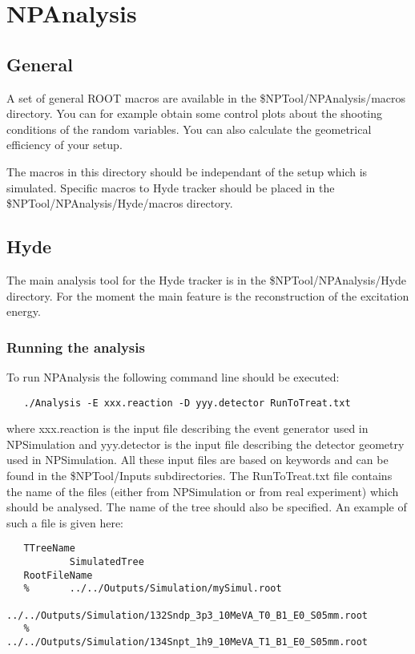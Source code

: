 \documentclass[a4paper,12pt]{article}
\begin{document}
\section{NPAnalysis}
\subsection{General}
A set of general ROOT macros are available in the \$NPTool/NPAnalysis/macros 
directory. You can for example obtain some control plots about the shooting
conditions of the random variables. You can also calculate the geometrical 
efficiency of your setup.

The macros in this directory should be independant of the setup which is simulated.
Specific macros to Hyde tracker should be placed in the 
\$NPTool/NPAnalysis/Hyde/macros directory.


\subsection{Hyde}
The main analysis tool for the Hyde tracker is in the \$NPTool/NPAnalysis/Hyde
directory. For the moment the main feature is the reconstruction of the excitation 
energy.

\subsubsection{Running the analysis}
To run NPAnalysis the following command line should be executed:

\begin{verbatim}
   ./Analysis -E xxx.reaction -D yyy.detector RunToTreat.txt
\end{verbatim}

where xxx.reaction is the input file describing the event generator used in 
NPSimulation and yyy.detector is the input file describing the detector geometry
used in NPSimulation. All these input files are based on keywords and can be found 
in the \$NPTool/Inputs subdirectories. The RunToTreat.txt file contains the
name of the files (either from NPSimulation or from real experiment) which should
be analysed. The name of the tree should also be specified. An example 
of such a file is given here:

\begin{verbatim}
   TTreeName
           SimulatedTree
   RootFileName
   %       ../../Outputs/Simulation/mySimul.root
           ../../Outputs/Simulation/132Sndp_3p3_10MeVA_T0_B1_E0_S05mm.root
   %       ../../Outputs/Simulation/134Snpt_1h9_10MeVA_T1_B1_E0_S05mm.root
\end{verbatim}
\end{document}
